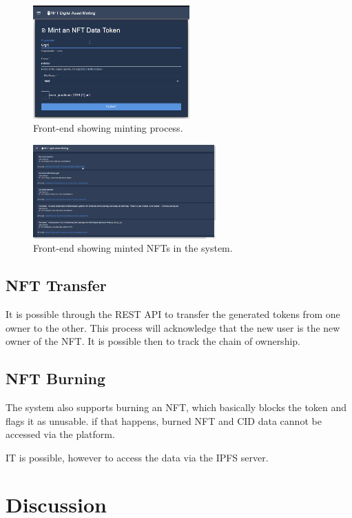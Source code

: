 \documentclass[a4paper]{article}
\begin{document}
 \begin{figure}[ht]
        \centering
        \includegraphics[width=6cm]{img/UIMinting.png}
        \caption{Front-end showing minting process.}
        \label{fig:UI_Mint}
    \end{figure}

 \begin{figure}[ht]
        \centering
        \includegraphics[width=7cm]{img/SystemList.png}
        \caption{Front-end showing minted NFTs in the system.}
        \label{fig:UI_MintTokens}
    \end{figure}
    
\subsection{NFT Transfer}
It is possible through the REST API to transfer the generated tokens from one owner to the other. This process will acknowledge that the new user is the new owner of the NFT. It is possible then to track the chain of ownership.

\subsection{NFT Burning}
The system also supports burning an NFT, which basically blocks the token and flags it as unusable. if that happens, burned NFT and CID data cannot be accessed via the platform.

IT is possible, however to access the data via the IPFS server.


\section{Discussion}
\end{document}
